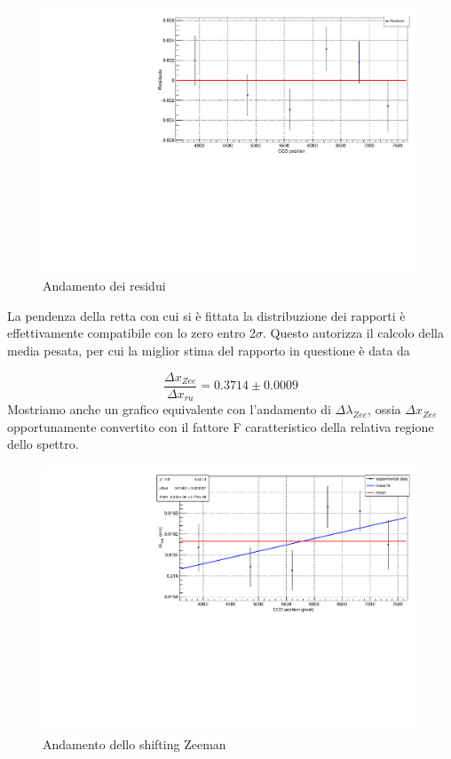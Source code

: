 \documentclass{article}
\begin{document}
	\begin{center}
		\begin{figure}[H]
			\centering
			\includegraphics[scale=0.38, angle=0]{campomax/residuals.pdf}
			\caption{Andamento dei residui}
			\label{fig:fit_rapporto_res}
		\end{figure}
	\end{center}

	La pendenza della retta con cui si è fittata la distribuzione dei rapporti è effettivamente
	compatibile con lo zero entro 2$\sigma$. Questo autorizza il calcolo della media pesata, per cui 
	la miglior stima del rapporto in questione è data da 

	\[
		\frac{\Delta x_{Zee}}{\Delta x_{ru}} = 0.3714 \pm 0.0009	
	\]
	Mostriamo anche un grafico equivalente con l'andamento di $\Delta\lambda_{Zee}$, ossia 
	$\Delta x_{Zee}$ opportunamente convertito con il fattore F caratteristico della relativa regione
	dello spettro.

	\begin{center}
		\begin{figure}[H]
			\centering
			\includegraphics[scale=0.38, angle=0]{campomax/dlambdazee.pdf}
			\caption{Andamento dello shifting Zeeman}
			\label{fig:fit_dlambdazee}
		\end{figure}
	\end{center}
\end{document}
